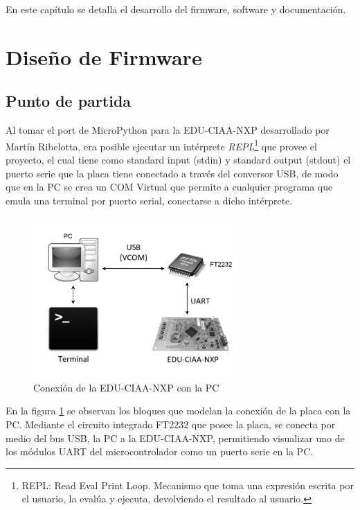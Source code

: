 En este capítulo se detalla el desarrollo del firmware, software y documentación.

\section{Diseño de Firmware}

\subsection{Punto de partida} 

Al tomar el port de MicroPython para la EDU-CIAA-NXP desarrollado por Martín Ribelotta, era posible ejecutar un intérprete \textit{REPL}\footnote{REPL: Read Eval Print Loop. Mecanismo que toma una expresión escrita por el usuario, la evalúa y ejecuta, devolviendo el resultado al usuario.} que provee el proyecto, el cual tiene como standard input (stdin) y standard output (stdout) el puerto serie que la placa tiene conectado a través del conversor USB, de modo que en la PC se crea un COM Virtual que permite a cualquier programa que emula una terminal por puerto serial, conectarse a dicho intérprete.

\begin{figure}[h]
  \centering
    \includegraphics[width=0.7\textwidth]{Figures/fig_conexion}
  \caption{Conexión de la EDU-CIAA-NXP con la PC}
  \label{fig:conexion}
\end{figure}

En la figura \ref{fig:conexion} se observan los bloques que modelan la conexión de la placa con la PC. Mediante el circuito integrado FT2232 que posee la placa, se conecta por medio del bus USB, la PC a la EDU-CIAA-NXP, permitiendo visualizar uno de los módulos UART del microcontrolador como un puerto serie en la PC.

